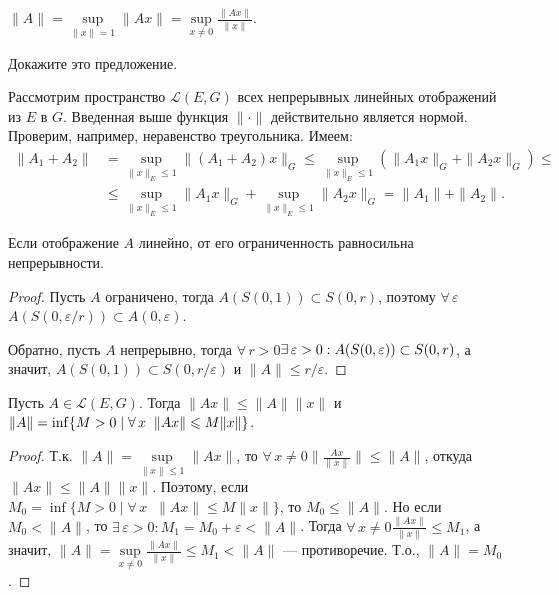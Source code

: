 \documentclass[10pt]{article}
\newcommand*{\p}[1]{#1\nobreak\discretionary{}{\hbox{$\mathsurround=0pt #1$}}{}}
\begin{document}
\begin{prop}
$\|A\|=\sup\limits_{\|x\|=1}\|Ax\|=\sup\limits_{x\neq
0}\frac{\|Ax\|}{\|x\|}$.
\end{prop}

\begin{problem}
Докажите это предложение.
\end{problem}

Рассмотрим пространство $\mathcal{L}(E,G)$ всех непрерывных линейных
отображений из $E$ в $G$. Введенная выше функция $\|\cdot\|$
действительно является нормой. Проверим, например, неравенство
треугольника. Имеем:
\begin{align*}
\|A_1+A_2\|&=\sup\limits_{\|x\|_E\leqslant 1}\|(A_1+A_2)x\|_G
\leqslant \sup\limits_{\|x\|_E\leqslant
1}(\|A_1x\|_G+\|A_2x\|_G)\leqslant
\\&\leqslant\sup\limits_{\|x\|_E\leqslant
1}\|A_1x\|_G+\sup\limits_{\|x\|_E\leqslant
1}\|A_2x\|_G=\|A_1\|+\|A_2\|.
\end{align*}

\begin{prop}
Если отображение $A$ линейно, от его ограниченность равносильна
непрерывности.
\end{prop}

\begin{proof}
Пусть $A$ ограничено, тогда $A(S(0,1))\subset S(0,r)$, поэтому
$\forall\,\varepsilon$\;\;$A(S(0,\varepsilon/r))\subset
A(0,\varepsilon)$.

Обратно, пусть $A$ непрерывно, тогда
$\forall\,r>0$\;\;$\exists\,\varepsilon
>0:A(S(0,\varepsilon))\p\subset S(0,r)$, а значит, $A(S(0,1))\subset
S(0,r/\varepsilon)$ и $\|A\|\leqslant r/\varepsilon$.
\end{proof}

\begin{prop}
Пусть $A\in\mathcal{L}(E,G)$. Тогда $\|Ax\|\leqslant \|A\|\|x\|$ и
$\|A\|\p=\inf\{M>0\mid \forall\,x\;\;\|Ax\|\leqslant M\|x\|\}$.
\end{prop}

\begin{proof}
Т.к. $\|A\|=\sup\limits_{\|x\|\leqslant 1}\|Ax\|$, то
$\forall\,x\neq 0$\;\;$\Big\|\frac{Ax}{\|x\|}\Big\|\leqslant\|A\|$,
откуда $\|Ax\|\leqslant\|A\|\|x\|$. Поэтому, если $M_0=\inf\{M>0\mid
\forall\,x\;\;\|Ax\|\leqslant M\|x\|\}$, то $M_0\leqslant\|A\|$. Но
если $M_0<\|A\|$, то
$\exists\,\varepsilon>0:M_1=M_0+\varepsilon<\|A\|$. Тогда
$\forall\,x\neq 0$\;\;$\frac{\|Ax\|}{\|x\|}\leqslant M_1$, а значит,
$\|A\|=\sup\limits_{x\neq0}\frac{\|Ax\|}{\|x\|}\leqslant M_1<\|A\|$
--- противоречие. Т.о., $\|A\|=M_0$.
\end{proof}
\end{document}
